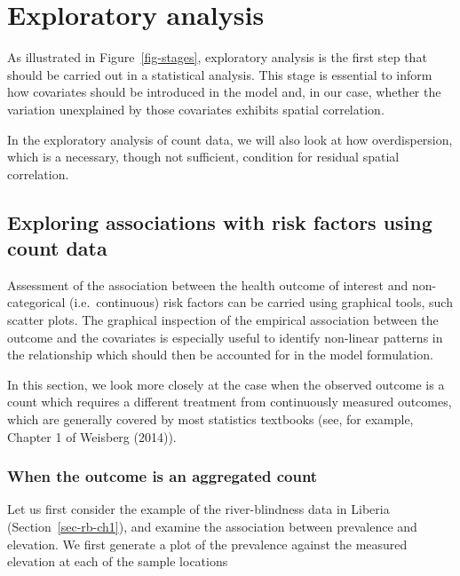 \documentclass[
  letterpaper,
]{krantz}
\newenvironment{Shaded}{\begin{snugshade}}{\end{snugshade}}
\newcommand{\AttributeTok}[1]{\textcolor[rgb]{0.13,0.29,0.53}{#1}}
\newcommand{\FunctionTok}[1]{\textcolor[rgb]{0.13,0.29,0.53}{\textbf{#1}}}
\newcommand{\NormalTok}[1]{#1}
\newcommand{\OtherTok}[1]{\textcolor[rgb]{0.56,0.35,0.01}{#1}}
\newcommand{\SpecialCharTok}[1]{\textcolor[rgb]{0.81,0.36,0.00}{\textbf{#1}}}
\newcommand{\StringTok}[1]{\textcolor[rgb]{0.31,0.60,0.02}{#1}}
\begin{document}
\section{Exploratory analysis}\label{exploratory-analysis}

As illustrated in Figure~\ref{fig-stages}, exploratory analysis is the
first step that should be carried out in a statistical analysis. This
stage is essential to inform how covariates should be introduced in the
model and, in our case, whether the variation unexplained by those
covariates exhibits spatial correlation.

In the exploratory analysis of count data, we will also look at how
overdispersion, which is a necessary, though not sufficient, condition
for residual spatial correlation.

\subsection{Exploring associations with risk factors using count
data}\label{sec-expl-assoc}

Assessment of the association between the health outcome of interest and
non-categorical (i.e.~continuous) risk factors can be carried using
graphical tools, such scatter plots. The graphical inspection of the
empirical association between the outcome and the covariates is
especially useful to identify non-linear patterns in the relationship
which should then be accounted for in the model formulation.

In this section, we look more closely at the case when the observed
outcome is a count which requires a different treatment from
continuously measured outcomes, which are generally covered by most
statistics textbooks (see, for example, Chapter 1 of Weisberg (2014)).

\subsubsection{When the outcome is an aggregated
count}\label{sec-agg-count-exp}

Let us first consider the example of the river-blindness data in Liberia
(Section~\ref{sec-rb-ch1}), and examine the association between
prevalence and elevation. We first generate a plot of the prevalence
against the measured elevation at each of the sample locations

\begin{Shaded}
\end{Shaded}
\end{document}
